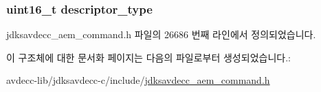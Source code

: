 \subsubsection[{\texorpdfstring{descriptor\+\_\+type}{descriptor_type}}]{\setlength{\rightskip}{0pt plus 5cm}uint16\+\_\+t descriptor\+\_\+type}\hypertarget{structjdksavdecc__aem__command__get__counters__response_ab7c32b6c7131c13d4ea3b7ee2f09b78d}{}\label{structjdksavdecc__aem__command__get__counters__response_ab7c32b6c7131c13d4ea3b7ee2f09b78d}


jdksavdecc\+\_\+aem\+\_\+command.\+h 파일의 26686 번째 라인에서 정의되었습니다.



이 구조체에 대한 문서화 페이지는 다음의 파일로부터 생성되었습니다.\+:\begin{DoxyCompactItemize}
\item 
avdecc-\/lib/jdksavdecc-\/c/include/\hyperlink{jdksavdecc__aem__command_8h}{jdksavdecc\+\_\+aem\+\_\+command.\+h}\end{DoxyCompactItemize}
